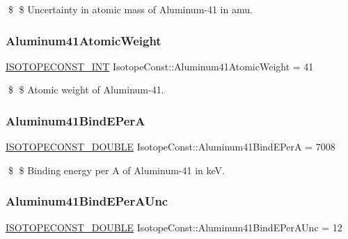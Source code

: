 \$ \$ Uncertainty in atomic mass of Aluminum-\/41 in amu. \mbox{\label{group___isotope_const-_aluminum-_al41_gaf8adfcba072d54219dfeebb40f138f4c}} 
\subsubsection{\texorpdfstring{Aluminum41\+Atomic\+Weight}{Aluminum41AtomicWeight}}
{\footnotesize\ttfamily \mbox{\hyperlink{group___isotope_const-_macros_ga5f18360b3e99483a35c32d789e62621c}{I\+S\+O\+T\+O\+P\+E\+C\+O\+N\+S\+T\+\_\+\+I\+NT}} Isotope\+Const\+::\+Aluminum41\+Atomic\+Weight = 41}

\$ \$ Atomic weight of Aluminum-\/41. \mbox{\label{group___isotope_const-_aluminum-_al41_gabd383fa08352354ea455ef47c6a812a8}} 
\subsubsection{\texorpdfstring{Aluminum41\+Bind\+E\+PerA}{Aluminum41BindEPerA}}
{\footnotesize\ttfamily \mbox{\hyperlink{group___isotope_const-_macros_ga8f45a7272ce02c0b4c65c44636ed719a}{I\+S\+O\+T\+O\+P\+E\+C\+O\+N\+S\+T\+\_\+\+D\+O\+U\+B\+LE}} Isotope\+Const\+::\+Aluminum41\+Bind\+E\+PerA = 7008}

\$ \$ Binding energy per A of Aluminum-\/41 in keV. \mbox{\label{group___isotope_const-_aluminum-_al41_ga2747dfe614b1a99fd63059e5569d38dc}} 
\subsubsection{\texorpdfstring{Aluminum41\+Bind\+E\+Per\+A\+Unc}{Aluminum41BindEPerAUnc}}
{\footnotesize\ttfamily \mbox{\hyperlink{group___isotope_const-_macros_ga8f45a7272ce02c0b4c65c44636ed719a}{I\+S\+O\+T\+O\+P\+E\+C\+O\+N\+S\+T\+\_\+\+D\+O\+U\+B\+LE}} Isotope\+Const\+::\+Aluminum41\+Bind\+E\+Per\+A\+Unc = 12}


